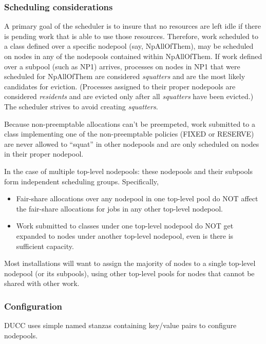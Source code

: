 \subsubsection{Scheduling considerations}
    A primary goal of the scheduler is to insure that no resources are left idle if there
    is pending work that is able to use those resources.  Therefore, work scheduled to
    a class defined over a specific nodepool (say, NpAllOfThem), may be scheduled on nodes
    in any of the nodepools contained within NpAllOfThem.  If work defined over a
    subpool (such as NP1) arrives, processes on nodes in NP1 that were scheduled for
    NpAllOfThem are considered {\em squatters} and are the most likely candidates for
    eviction. (Processes assigned to their proper nodepools are considered {\em residents}
    and are evicted only after all {\em squatters} have been evicted.)  The scheduler strives
    to avoid creating {\em squatters}.

    Because non-preemptable allocations can't be preempeted, work submitted to a class
    implementing one of the non-preemptable policies (FIXED or RESERVE) are never allowed
    to ``squat'' in other nodepools and are only scheduled on nodes in their
    proper nodepool.

    In the case of multiple top-level nodepools: these nodepools and their subpools
    form independent scheduling groups.  Specifically,
    \begin{itemize}
        \item Fair-share allocations over any nodepool in one top-level pool do NOT affect the
          fair-share allocations for jobs in any other top-level nodepool. 

        \item Work submitted to classes under one top-level nodepool do NOT get expanded to
          nodes under another top-level nodepool, even is there is sufficient capacity.
    \end{itemize}

    Most installations will want to assign the majority of nodes to a single top-level
    nodepool (or its subpools), using other top-level pools for nodes that cannot be
    shared with other work.

\subsubsection{Configuration}
\label{subsubsec:nodepool.configuration}
    DUCC uses simple named stanzas containing key/value pairs to configure nodepools.


